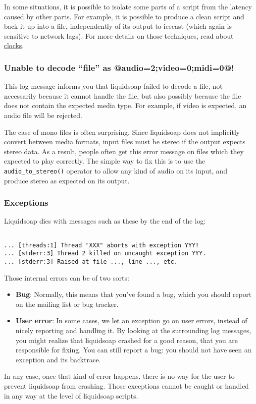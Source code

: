In some situations, it is possible to isolate some parts of a script
from the latency caused by other parts. For example, it is possible to
produce a clean script and back it up into a file, independently of
its output to icecast (which again is sensitive to network lags).
For more details on those techniques, read about \href{clocks.html}{clocks}.

\subsubsection{Unable to decode ``file'' as @{audio=2;video=0;midi=0}@!}
This log message informs you that liquidsoap failed to decode a file, not 
necessarily because it cannot handle the file, but also possibly because
the file does not contain the expected media type. For example, if video
is expected, an audio file will be rejected.

The case of mono files is often surprising. Since liquidsoap does not
implicitly convert between media formats, input files must be stereo
if the output expects stereo data. As a result, people often get this
error message on files which they expected to play correctly. The
simple way to fix this is to use the \verb+audio_to_stereo()+ operator
to allow any kind of audio on its input, and produce stereo as expected
on its output.

\subsubsection{Exceptions}
Liquidsoap dies with messages such as these by the end of the log:

\begin{verbatim}

... [threads:1] Thread "XXX" aborts with exception YYY!
... [stderr:3] Thread 2 killed on uncaught exception YYY.
... [stderr:3] Raised at file ..., line ..., etc.
\end{verbatim}
Those internal errors can be of two sorts:

\begin{itemize}
\item \textbf{Bug}: Normally, this means that you've found a bug, which you should report on the mailing list or bug tracker.
\item \textbf{User error}: In some cases, we let an exception go on user errors, instead of nicely reporting and handling it. By looking at the surrounding log messages, you might realize that liquidsoap crashed for a good reason, that you are responsible for fixing. You can still report a bug: you should not have seen an exception and its backtrace.

\end{itemize}
In any case, once that kind of error happens, there is no way for the
user to prevent liquidsoap from crashing. Those exceptions cannot be
caught or handled in any way at the level of liquidsoap scripts.

